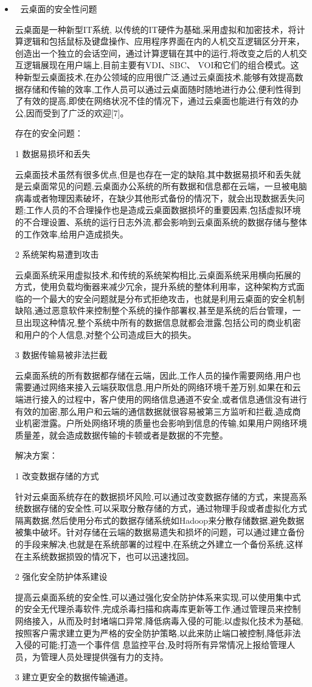 \documentclass{article}
\begin{document}
\begin{itemize}
    \item	云桌面的安全性问题\par
    云桌面是一种新型IT系统, 以传统的IT硬件为基础,采用虚拟和加密技术，将计算逻辑和包括鼠标及键盘操作、应用程序界面在内的人机交互逻辑区分开来，创造出一个独立的会话空间，通过计算逻辑在其中的运行,将改变之后的人机交互逻辑展现在用户端上,目前主要有VDI、SBC、 VOI和它们的组合模式。这种新型云桌面技术,在办公领域的应用很广泛,通过云桌面技术,能够有效提高数据存储和传输的效率,工作人员可以通过云桌面随时随地进行办公,便利性得到了有效的提高,即使在网络状况不佳的情况下，通过云桌面也能进行有效的办公,因而受到了广泛的欢迎[7]。\par
    存在的安全问题：\par
    1 数据易损坏和丢失\par 云桌面技术虽然有很多优点,但是也存在一定的缺陷,其中数据易损坏和丢失就是云桌面常见的问题,云桌面办公系统的所有数据和信息都在云端，一旦被电脑病毒或者物理因素破坏，在缺少其他形式备份的情况下，就会出现数据丢失问题;工作人员的不合理操作也是造成云桌面数据损坏的重要因素,包括虚拟环境的不合理设置、系统的运行日志外流,都会影响到云桌面系统的数据存储与整体的工作效率,给用户造成损失。\par 2 系统架构易遭到攻击\par 云桌面系统采用虚拟技术,和传统的系统架构相比,云桌面系统采用横向拓展的方式，使用负载均衡器来减少冗余，提升系统的整体利用率，这种架构方式面临的一个最大的安全问题就是分布式拒绝攻击，也就是利用云桌面的安全机制缺陷,通过恶意软件来控制整个系统的操作部署权,甚至是系统的后台管理，一旦出现这种情况,整个系统中所有的数据信息就都会泄露,包括公司的商业机密和用户的个人信息,对整个公司造成巨大的损失。\par 3 数据传输易被非法拦截\par 云桌面系统的所有数据都存储在云端，因此,工作人员的操作需要网络,用户也需要通过网络来接入云端获取信息,用户所处的网络环境千差万别,如果在和云端进行接入的过程中，客户使用的网络信息通道不安全,或者信息通信没有进行有效的加密,那么用户和云端的通信数据就很容易被第三方监听和拦截,造成商业机密泄露。户所处网络环境的质量也会影响到信息的传输,如果用户网络环境质量差，就会造成数据传输的卡顿或者是数据的不完整。\par
    解决方案：\par
    1 改变数据存储的方式\par 针对云桌面系统存在的数据损坏风险,可以通过改变数据存储的方式，来提高系统数据存储的安全性,可以采取分散存储的方式，通过物理手段或者虚拟化方式隔离数据,然后使用分布式的数据存储系统如Hadoop来分散存储数据,避免数据被集中破坏。针对存储在云端的数据易遗失和损坏的问题，可以通过建立备份的手段来解决,也就是在系统部署的过程中,在系统之外建立一个备份系统,这样在主系统数据损毁的情况下，也可以迅速找回。\par 2 强化安全防护体系建设\par 提高云桌面系统的安全性,可以通过强化安全防护体系来实现,可以使用集中式的安全无代理杀毒软件,完成杀毒扫描和病毒库更新等工作,通过管理员来控制网络接入，从而及时封堵端口异常,降低病毒入侵的可能;以虚拟化技术为基础,按照客户需求建立更为严格的安全防护策略,以此来防止端口被控制,降低非法入侵的可能;打造一个事件信 息监控平台,及时将所有异常情况上报给管理人员，为管理人员处理提供强有力的支持。\par 3 建立更安全的数据传输通道。\par

\end{itemize}
\end{document}
